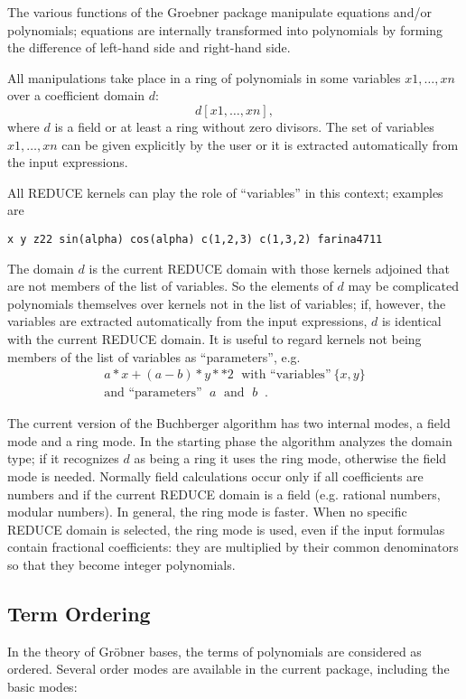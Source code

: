 The various functions of the Groebner package manipulate
equations and/or polynomials; equations are internally
transformed into  polynomials by forming the difference of
left-hand side and right-hand side.

All manipulations take place in a ring of polynomials in some
variables $x1, \ldots , xn$ over a coefficient domain $d$:
\[ d [x1,\ldots , xn], \]
where $d$ is a field or at least a ring without zero divisors.
The set of variables $x1,\ldots ,xn$ can be given explicitly by the
user or it is extracted automatically from the
input expressions.

All REDUCE kernels can play the role of ``variables'' in this context;
examples are

\begin{verbatim}
x y z22 sin(alpha) cos(alpha) c(1,2,3) c(1,3,2) farina4711
\end{verbatim}

The domain $d$ is the current REDUCE domain with those kernels
adjoined that are not members of the list of variables. So the
elements of $d$ may be complicated polynomials themselves over
kernels not in the list of variables; if, however, the variables are
extracted automatically from the input expressions, $d$ is identical
with the current REDUCE domain. It is useful to regard kernels not
being members of the list of variables as ``parameters'', e.g.
\[
\begin{array}{c}
 a * x + (a - b) * y**2 \;\mbox{ with ``variables''}\ \{x,y\} \\
\mbox{and ``parameters''  $\;a\;$ and $\;b\;$}\;.
\end{array}
\]

The current version of the Buchberger algorithm has two internal
modes, a field mode and a ring mode. In the starting phase the
algorithm analyzes the domain type; if it recognizes $d$ as being a
ring it uses the ring mode, otherwise the field mode is needed.
Normally field calculations occur only if all coefficients are numbers
and if the current REDUCE domain is a field (e.g. rational numbers,
modular numbers). In general, the ring mode is faster. When no specific
REDUCE domain is selected, the ring mode is used, even if the input
formulas contain fractional coefficients: they are multiplied by their
common denominators so that they become integer polynomials.

\subsection{Term Ordering} \par
In the theory of Gr\"obner bases, the terms of polynomials are
considered as ordered. Several order modes are available in
the current package, including the basic modes:
 

